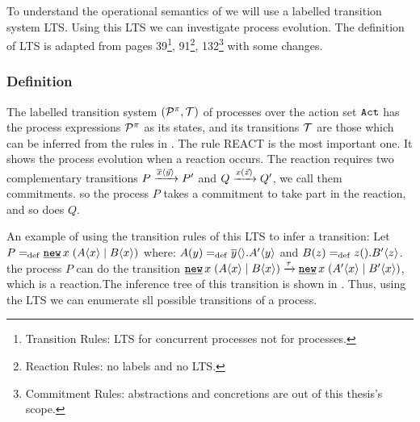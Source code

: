 To understand the operational semantics of \picalc{} we will use  a labelled transition system LTS. Using this LTS we can investigate \picalc{} process evolution. The definition of LTS is adapted from \cite{milner} pages 39\footnote{Transition Rules: LTS for concurrent processes not for \picalc{} processes.}, 91\footnote{Reaction Rules: no labels and no LTS.}, 132\footnote{Commitment Rules: abstractions and concretions are out of this thesis's scope.} with some changes.

\subsubsection{Definition}
\begin{definition}
\label{def_trans_system}

The labelled transition system $(\procs,\traces)$ of \picalc{} processes over the action set $\mathtt{Act}$ has the process expressions $\mathcal P^{\pi}$ as its states, and its transitions $\traces$ are those which can be inferred from the rules in .
The rule REACT is the most important one. It shows the process evolution when a reaction occurs. The reaction requires two complementary transitions $P \xrightarrow{\overline{x}\langle\vec{y}\rangle} P'$ and $Q \xrightarrow{x(\vec{z})} Q'$, we call them commitments. so the process $P$ takes a commitment to take part in the reaction, and so does $Q$.

\end{definition}


An example of using the transition rules of this LTS to infer a transition: Let $P\define\procres{x}{(\procpar{\proccall{A}{x}}{\proccall{B}{x}})}$ where: $A(y)=_{\mathrm{def}}{}\overline{y}\langle{}\rangle.A'\langle y\rangle$ and $B(z)=_{\mathrm{def}}{}z({}).B'\langle z\rangle$. the process $P$ can do the transition $\procres{x}{(\procpar{\proccall{A}{x}}{\proccall{B}{x}})} \transs{\tau} \procres{x}{(\procpar{\proccall{A'}{x}}{\proccall{B'}{x}})}$, which is a reaction.The inference tree of this transition is shown in . Thus, using the LTS we can enumerate sll possible transitions of a \picalc{} process.



